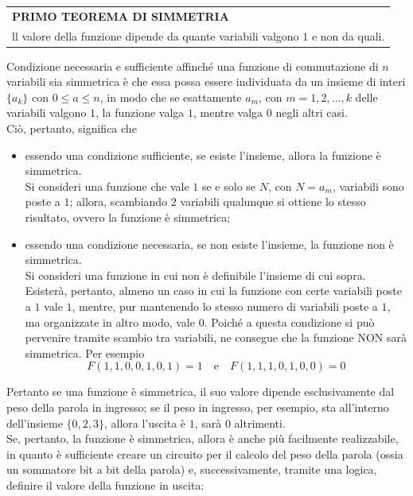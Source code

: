 \documentclass[a4paper]{extarticle}
\renewcommand\arraystretch{}
\begin{document}
\vspace{1em}
\setlength{\tabcolsep}{14pt}
\renewcommand{\arraystretch}{2}
\noindent
\begin{tabularx}{\textwidth}{@{}|P|@{}}
    \hline
    {\textbf{PRIMO TEOREMA DI SIMMETRIA}}\\
    \parbox{\linewidth}{ll valore della funzione dipende da quante variabili valgono $1$ e non da quali.\vspace{3mm}}\\
    \hline
\end{tabularx}

\vspace{1em}
\noindent
Condizione necessaria e sufficiente affinché una funzione di commutazione di $n$ variabili sia simmetrica è che essa possa essere individuata da un insieme di interi $\{a_k\}$ con $0 \leq a \leq n$, in modo che se esattamente $a_m$, con $m = 1,2,\dots, k$ delle variabili valgono $1$, la funzione valga $1$, mentre valga $0$ negli altri casi.\\
Ciò, pertanto, significa che
\begin{itemize}
    \item essendo una condizione sufficiente, se esiste l'insieme, allora la funzione è simmetrica.\\
    Si consideri una funzione che vale $1$ se e solo se $N$, con $N=a_m$, variabili sono poste a $1$; allora, scambiando $2$ variabili qualunque si ottiene lo stesso risultato, ovvero la funzione è simmetrica;

    \item essendo una condizione necessaria, se non esiste l'insieme, la funzione non è simmetrica.\\
    Si consideri una funzione in cui non è definibile l'insieme di cui sopra. Esisterà, pertanto, almeno un caso in cui la funzione con certe variabili poste a $1$ vale $1$, mentre, pur mantenendo lo stesso numero di variabili poste a $1$, ma organizzate in altro modo, vale $0$. Poiché a questa condizione si può pervenire tramite scambio tra variabili, ne consegue che la funzione NON sarà simmetrica. Per esempio
    \[F(1,1,0,0, 1,0,1) = 1 \hspace{1em} \text{e} \hspace{1em} F(1,1,1,0,1,0,0) = 0\]
\end{itemize}
Pertanto se una funzione è simmetrica, il suo valore dipende esclusivamente dal peso della parola in ingresso; se il peso in ingresso, per esempio, sta all'interno dell'insieme $\{0,2,3\}$, allora l'uscita è $1$, sarà $0$ altrimenti.\\
Se, pertanto, la funzione è simmetrica, allora è anche più facilmente realizzabile, in quanto è sufficiente creare un circuito per il calcolo del peso della parola (ossia un sommatore bit a bit della parola) e, successivamente, tramite una logica, definire il valore della funzione in uscita:
\end{document}
